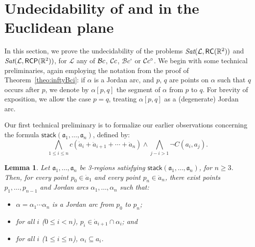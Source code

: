 \documentclass{article}
\newtheorem{lemma}[theorem]{Lemma}
\newcommand{\Sat}{\textit{Sat}}
\newcommand{\cBci}{\ensuremath{\mathcal{B}c^\circ}}
\newcommand{\R}{\mathbb{R}}
\newcommand{\RC}{{\sf RC}}
\newcommand{\RCP}{{\sf RCP}}
\newcommand{\cL}{\mathcal{L}}
\newcommand{\tseq}[1]{\mathfrak{#1}}
\newcommand{\intermediate}[1]{\dot{#1}}
\newcommand{\inner}[1]{\ddot{#1}}
\newcommand{\stack}{\mathsf{stack}}
\begin{document}
\section{Undecidability of \cBc{} and \cBCc{} in the Euclidean plane}
\label{sec:UndecidabilityB}
In this section, we prove the undecidability of the problems
$\Sat(\cL,\RC(\R^2))$ and $\Sat(\cL,\RCP(\R^2))$, for $\cL$ any of
$\mathcal{B}c$, $\mathcal{C}c$, $\cBci$ or $\mathcal{C}c^\circ$. We begin with some technical
preliminaries, again employing the notation from the proof of
Theorem~\ref{theo:inftyBci}: if $\alpha$ is a Jordan arc, and $p$, $q$
are points on $\alpha$ such that $q$ occurs after $p$, we denote by
$\alpha[p,q]$ the segment of $\alpha$ from $p$ to $q$. For brevity of
exposition, we allow the case $p= q$, treating $\alpha[p,q]$ as a
(degenerate) Jordan arc.

Our first technical preliminary is to formalize our earlier observations
concerning the formula $\stack(\tseq{a}_1, \ldots, \tseq{a}_n)$,
defined by:
\begin{equation*}
\bigwedge_{1 \leq i \leq n}
     c(\intermediate{a}_i + \inner{a}_{i + 1} + \cdots + \inner{a}_n)
\mbox{}\wedge
\bigwedge_{j - i > 1} \neg C(a_i,a_j).
\end{equation*}
\begin{lemma}
\label{lma:stackLemma}
Let $\tseq{a}_1,\ldots,\tseq{a}_n$ be 3-regions satisfying
$\stack(\tseq{a}_1,\ldots,\tseq{a}_n)$, for $n \geq 3$.  Then, for
every point $p_0\in \intermediate{a}_1$ and every point $p_n \in
\inner{a}_n$, there exist points $p_1, \ldots, p_{n-1}$ and Jordan
arcs $\alpha_1, \ldots, \alpha_n$ such that\textup{:}
\begin{itemize}
\item[\textup{(}i\textup{)}]
$\alpha = \alpha_1 \cdots \alpha_n$ is a Jordan arc from $p_0$ to
$p_n$\textup{; }
\item[\textup{(}ii\textup{)}] for all $i$ \textup{(}$0 \leq i < n$\textup{)}, $p_i \in
\intermediate{a}_{i+1} \cap \alpha_i$\textup{;} and 
\item[\textup{(}iii\textup{)}]
for all $i$ \textup{(}$1 \leq i \leq n$\textup{)}, $\alpha_i \subseteq a_i$.
\end{itemize}
\end{lemma}
\end{document}
